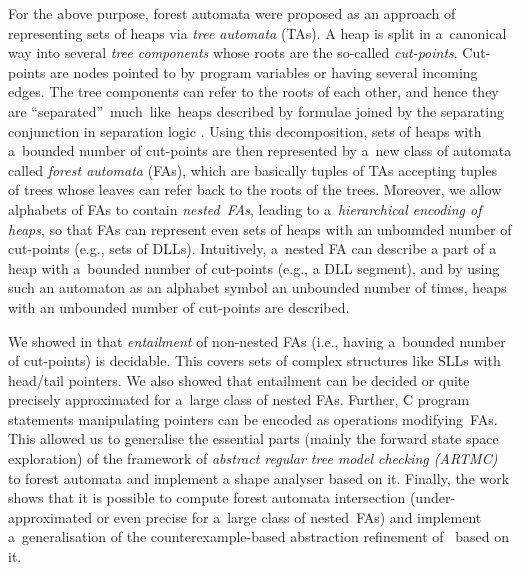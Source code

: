 For the above purpose, forest automata were proposed as an approach of representing sets of heaps
via \emph{tree automata} (TAs). A heap is split in
a~canonical way into several \emph{tree components} whose roots are the so-called
\emph{cut-points}. Cut-points are nodes pointed to by program variables or
having several incoming edges. The tree components can refer to the roots of
each other, and hence they are ``separated''~much~like~heaps described by
formulae joined by the separating conjunction in separation logic
\cite{Reynolds:SepLogic:02}. Using this decomposition, sets of heaps with
a~bounded number of cut-points are then represented by a~new class of automata
called \emph{forest automata} (FAs), which are basically tuples of TAs accepting
tuples of trees whose leaves can refer back to the roots of the trees. Moreover,
we allow alphabets of FAs to contain \emph{nested~FAs}, leading to
a~\emph{hierarchical encoding of heaps}, so that FAs can represent even sets of
heaps with an unbounded number of cut-points (e.g., sets of DLLs). Intuitively,
a~nested FA can describe a part of a heap with a~bounded number of cut-points
(e.g., a DLL segment), and by using such an automaton as an alphabet symbol an
unbounded number of times,  heaps with an unbounded number of cut-points are
described. 

We showed in \cite{habermehl:forest} that
\emph{entailment} of non-nested FAs
(i.e., having a~bounded number of cut-points) is decidable. This covers  sets of
complex structures like SLLs with head/tail pointers. 
We also showed that entailment can be decided or quite precisely approximated for a~large class
of nested FAs. 
Further, C program statements manipulating pointers can be encoded as operations
modifying~FAs. 
%
This allowed us to generalise the essential parts (mainly the forward state space exploration) of the framework of 
\emph{abstract regular tree model checking (ARTMC)} \cite{bhrv06a,bhrv06b} to forest automata and implement a shape analyser based on it. 
%
Finally, the work \cite{vmcai17} shows that it is possible to compute forest
automata intersection (under-approximated or even precise for a~large class
of nested~FAs) and implement a~generalisation of the
counterexample-based abstraction refinement of~\cite{bhrv06a,bhrv06b} based on it. 


